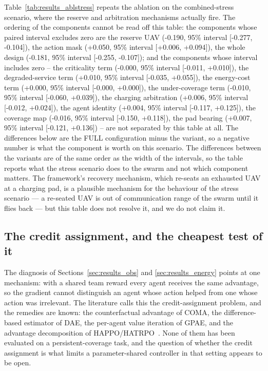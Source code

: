 \documentclass[conference]{IEEEtran}
\begin{document}
Table~\ref{tab:results_ablstress} repeats the ablation on the combined-stress scenario, where the reserve and arbitration mechanisms actually fire. The ordering of the components cannot be read off this table: the components whose paired interval excludes zero are the reserve UAV (-0.190, 95\% interval [-0.277, -0.104]), the action mask (+0.050, 95\% interval [+0.006, +0.094]), the whole design (-0.181, 95\% interval [-0.255, -0.107]); and the components whose interval includes zero -- the criticality term (-0.000, 95\% interval [-0.011, +0.010]), the degraded-service term (+0.010, 95\% interval [-0.035, +0.055]), the energy-cost term (+0.000, 95\% interval [-0.000, +0.000]), the under-coverage term (-0.010, 95\% interval [-0.060, +0.039]), the charging arbitration (+0.006, 95\% interval [-0.012, +0.024]), the agent identity (+0.004, 95\% interval [-0.117, +0.125]), the coverage map (-0.016, 95\% interval [-0.150, +0.118]), the pad bearing (+0.007, 95\% interval [-0.121, +0.136]) -- are not separated by this table at all.  The differences below are the FULL configuration minus the variant, so a negative number is what the component is worth on this scenario.  The differences between the variants are of the same order as the width of the intervals, so the table reports what the stress scenario does to the swarm and not which component matters.  The framework's recovery mechanism, which re-seats an exhausted UAV at a charging pad, is a plausible mechanism for the behaviour of the stress scenario --- a re-seated UAV is out of communication range of the swarm until it flies back --- but this table does not resolve it, and we do not claim it.

\subsection{The credit assignment, and the cheapest test of it}
\label{sec:results_credit}

The diagnosis of Sections~\ref{sec:results_obs} and
\ref{sec:results_energy} points at one mechanism: with a shared team
reward every agent receives the same advantage, so the gradient cannot
distinguish an agent whose action helped from one whose action was
irrelevant.  The literature calls this the credit-assignment problem, and
the remedies are known: the counterfactual advantage of COMA, the
difference-based estimator of DAE, the per-agent value iteration of GPAE, and
the advantage decomposition of HAPPO/HATRPO~\cite{foerster2018,li2022,kim2026,kuba2022}.
None of them has been evaluated on a persistent-coverage task, and the
question of whether the credit assignment is what limits a
parameter-shared controller in that setting appears to be open.
\end{document}
